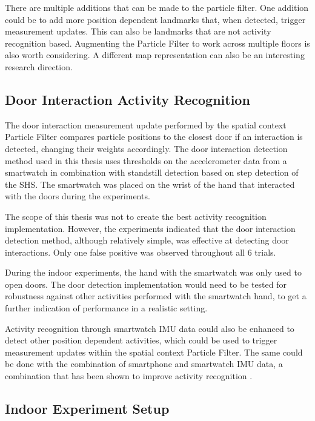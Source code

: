 There are multiple additions that can be made to the particle filter. One addition could be to add more position dependent landmarks that, when detected, trigger measurement updates. This can also be landmarks that are not activity recognition based. Augmenting the Particle Filter to work across multiple floors is also worth considering. A different map representation can also be an interesting research direction.

\subsection{Door Interaction Activity Recognition}

The door interaction measurement update performed by the spatial context Particle Filter compares particle positions to the closest door if an interaction is detected, changing their weights accordingly. The door interaction detection method used in this thesis uses thresholds on the accelerometer data from a smartwatch in combination with standstill detection based on step detection of the \ac{SHS}. The smartwatch was placed on the wrist of the hand that interacted with the doors during the experiments.\par 

The scope of this thesis was not to create the best activity recognition implementation. However, the experiments indicated that the door interaction detection method, although relatively simple, was effective at detecting door interactions. Only one false positive was observed throughout all 6 trials. \par 

During the indoor experiments, the hand with the smartwatch was only used to open doors. The door detection implementation would need to be tested for robustness against other activities performed with the smartwatch hand, to get a further indication of performance in a realistic setting. \par 

Activity recognition through smartwatch IMU data could also be enhanced to detect other position dependent activities, which could be used to trigger measurement updates within the spatial context Particle Filter. The same could be  done with the combination of smartphone and smartwatch IMU data, a combination that has been shown to improve activity recognition \cite{Shoaib2016}.

\subsection{Indoor Experiment Setup}


